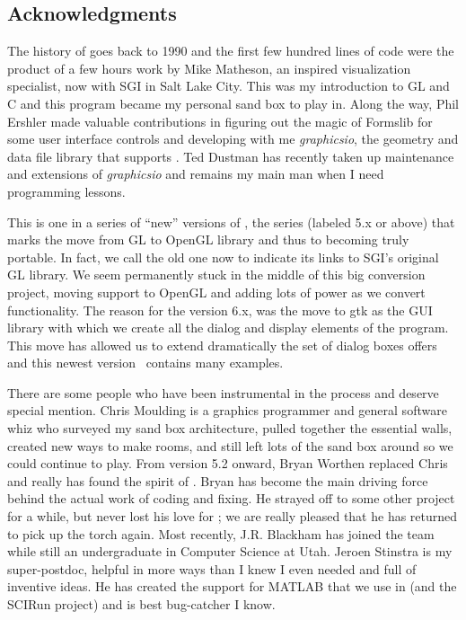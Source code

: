 \subsection{Acknowledgments}

The history of \map{} goes back to 1990 and the first few hundred lines of
code were the product of a few hours work by Mike Matheson, an inspired
visualization specialist, now with SGI in Salt Lake City.  This was my
introduction to GL and C and this program became my personal sand box to
play in.  Along the way, Phil Ershler made valuable contributions in
figuring out the magic of Formslib for some user interface controls and
developing with me \emph{graphicsio}, the geometry and data file library
that supports \map{}.  Ted Dustman has recently taken up maintenance and
extensions of \emph{graphicsio} and remains my main man when I need
programming lessons.

This is one in a series of ``new'' versions of \map{}, the series (labeled
5.x or above) that marks the move from GL to OpenGL library and thus to
becoming truly portable.  In fact, we call the old one \mapgl{} now to
indicate its links to SGI's original GL library.  We seem permanently stuck
in the middle of this big conversion project, moving support to OpenGL and
adding lots of power as we convert functionality.  The reason for the
version 6.x, was the move to gtk as the GUI library with which we create
all the dialog and display elements of the program.  This move has allowed
us to extend dramatically the set of dialog boxes \map{} offers and this
newest version~\version{} contains many examples.

There are some people who have been instrumental in the process and deserve
special mention.  Chris Moulding is a graphics programmer and general
software whiz who surveyed my sand box architecture, pulled together the
essential walls, created new ways to make rooms, and still left lots of the
sand box around so we could continue to play.  From version 5.2 onward,
Bryan Worthen replaced Chris and really has found the spirit of \map{}.
Bryan has become the main driving force behind the actual work of coding
and fixing.  He strayed off to some other project for a while, but never
lost his love for \map{}; we are really pleased that he has returned to
pick up the torch again.  Most recently, J.R. Blackham has joined the team
while still an undergraduate in Computer Science at Utah.  Jeroen Stinstra
is my super-postdoc, helpful in more ways than I knew I even needed and
full of inventive ideas.  He has created the support for MATLAB that we use
in \map{} (and the SCIRun project) and is best bug-catcher I know.

